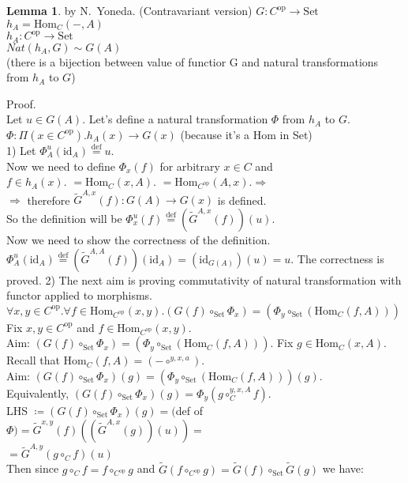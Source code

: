 \documentclass[10pt,a4paper]{article}
\theoremstyle{definition}
\newtheorem{lemma}{Lemma}[section]
\newcommand{\Hom}{{\mbox{Hom}}}
\newcommand{\GMor}{{\widetilde{G}\mbox{}}}
\newcommand{\op}{{\mbox{op}}}
\newcommand{\id}{{\mbox{id}}}
\newcommand{\defi}{{\mbox{def}}}
\newcommand{\eqdef}{{\stackrel{\defi}{=}}}
\newcommand{\Set}{{\mbox{Set}}}
\begin{document}
\begin{lemma}{by N.~Yoneda. (Contravariant version)}
$G : C^\op \to \Set$\\
$h_A = \Hom_C(-,A)$\\
$h_A : C^\op \to \Set$\\
$Nat(h_A,G)\sim G(A)$\\
(there is a bijection between value of functior G and natural transformations from $h_A$ to $G$)\\
\end{lemma}
\noindent Proof.\\
Let $u\in G(A)$. Let's define a natural transformation $\Phi$ from $h_A$ to $G$.\\
$\Phi:\Pi(x\in C^\op).h_A(x)\to G(x)$ (because it's a Hom in Set)\\
1) Let $\Phi^u_A(\id_A)\eqdef u$. \\
Now we need to define $\Phi_x(f)$ for arbitrary $x\in C$ and\\
$f\in h_A(x).$ $=\Hom_C(x,A).$ $=\Hom_{C^\op}(A,x). \Longrightarrow$\\
$\Longrightarrow$ therefore $\GMor ^{A,x}(f):G(A)\to G(x)$ is defined.\\
So the definition will be $\Phi^u_x(f)\eqdef (\GMor^{A,x}(f))(u)$.\\
Now we need to show the correctness of the definition.\\
$\Phi^u_A(\id_A)\eqdef (\GMor^{A,A}(f))(\id_A) = (\id_{G(A)})(u) = u$. The correctness is proved.
2) The next aim is proving commutativity of natural transformation with functor applied to morphisms.\\
$\forall x,y\in C^\op.\forall f\in \Hom_{C^\op}(x,y).(G(f)\circ_\Set \Phi_x) = (\Phi_y \circ_\Set (\Hom_C(f,A)))$
Fix  $x,y\in C^\op$ and $f\in \Hom_{C^\op}(x,y)$.\\
Aim: $(G(f)\circ_\Set \Phi_x) = (\Phi_y \circ_\Set (\Hom_C(f,A)))$.
Fix $g\in \Hom_C(x,A)$. Recall that $\Hom_C(f,A)=(-\circ^{y,x,a})$.\\
Aim: $(G(f)\circ_\Set \Phi_x)(g) = (\Phi_y \circ_\Set (\Hom_C(f,A)))(g)$.\\
Equivalently, $(G(f)\circ_\Set \Phi_x)(g) = \Phi_y (g\circ_C^{y,x,A} f)$.\\
LHS $\coloneqq (G(f)\circ_\Set \Phi_x)(g) =($def of $\Phi)= \GMor^{x,y}(f)\left(\left(\GMor^{A,x}\left(g\right)\right)\left(u\right)\right) =$\\
$ =\GMor^{A,y}\left(g\circ_C f\right)(u)$\\
Then since $g\circ_C f = f\circ_{C^\op} g$ and $\GMor(f\circ_{C^\op} g)=  \GMor(f)\circ_\Set \GMor(g)$ we have:\\
\end{document}
